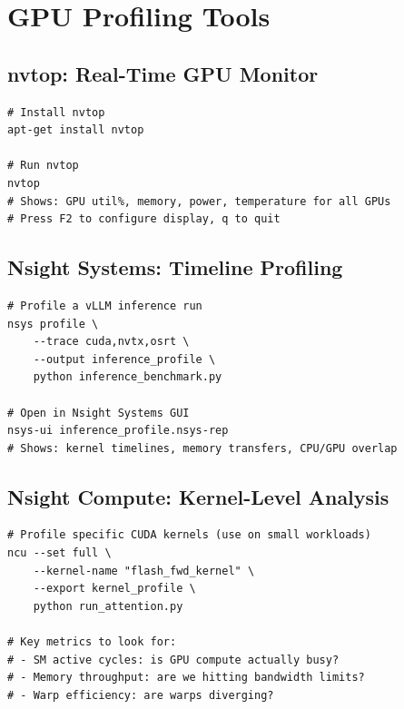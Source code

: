 \documentclass[11pt, twoside, openright]{book}
\begin{document}
\section{GPU Profiling Tools}

\subsection{nvtop: Real-Time GPU Monitor}

\begin{lstlisting}[style=bashstyle, caption={Using nvtop for GPU monitoring}]
# Install nvtop
apt-get install nvtop

# Run nvtop
nvtop
# Shows: GPU util%, memory, power, temperature for all GPUs
# Press F2 to configure display, q to quit
\end{lstlisting}

\subsection{Nsight Systems: Timeline Profiling}

\begin{lstlisting}[style=bashstyle, caption={Profiling with Nsight Systems}]
# Profile a vLLM inference run
nsys profile \
    --trace cuda,nvtx,osrt \
    --output inference_profile \
    python inference_benchmark.py

# Open in Nsight Systems GUI
nsys-ui inference_profile.nsys-rep
# Shows: kernel timelines, memory transfers, CPU/GPU overlap
\end{lstlisting}

\subsection{Nsight Compute: Kernel-Level Analysis}

\begin{lstlisting}[style=bashstyle, caption={Per-kernel profiling with ncu}]
# Profile specific CUDA kernels (use on small workloads)
ncu --set full \
    --kernel-name "flash_fwd_kernel" \
    --export kernel_profile \
    python run_attention.py

# Key metrics to look for:
# - SM active cycles: is GPU compute actually busy?
# - Memory throughput: are we hitting bandwidth limits?
# - Warp efficiency: are warps diverging?
\end{lstlisting}
\end{document}
